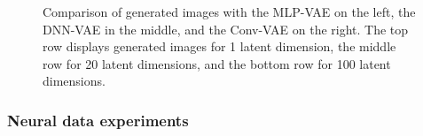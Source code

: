 \begin{figure}[!htb]
\qquad
{}
\caption{Comparison of generated images with the MLP-VAE on the left, the DNN-VAE in the middle, and the Conv-VAE on the right. The top row displays generated images for 1 latent dimension, the middle row for 20 latent dimensions, and the bottom row for 100 latent dimensions.}
\label{fig:samples_latent_dim_vanilla_vae_bmnist}
\end{figure}

\subsubsection*{Neural data experiments}





